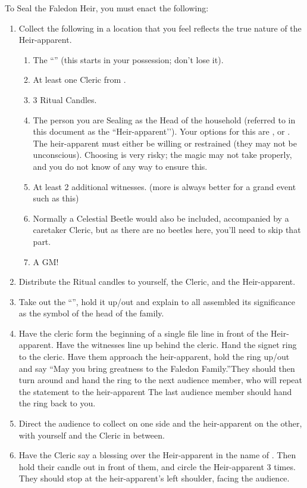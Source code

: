 \documentclass[green]{GL2020}
\begin{document}
To Seal the Faledon Heir, you must enact the following:
\begin{enumerate}
  \item Collect the following in a location that you feel reflects the true nature of the Heir-apparent.
    \begin{enumerate}
      \item The ``\iFaledonRing{}'' (this starts in your possession; don’t lose it).
      \item At least one Cleric from \pTech{}.
      \item 3 Ritual Candles.
      \item The person you are Sealing as the Head of the \cFaledonParent{\formal} household (referred to in this document as the ``Heir-apparent’’). Your options for this are \cHeir{}, or \cAmbition{}. The heir-apparent must either be willing or restrained (they may not be unconscious). Choosing \cAmbition{} is very risky; the magic may not take properly, and you do not know of any way to ensure this.
      \item At least 2 additional witnesses. (more is always better for a grand event such as this)
      \item Normally a Celestial Beetle would also be included, accompanied by a caretaker Cleric, but as there are no beetles here, you’ll need to skip that part.
      \item A GM!
    \end{enumerate}
  \item Distribute the Ritual candles to yourself, the Cleric, and the Heir-apparent.
  \item Take out the ``\iFaledonRing{}'', hold it up/out and explain to all assembled its significance as the symbol of the head of the \cFaledonParent{\formal} family.
  \item Have the cleric form the beginning of a single file line in front of the Heir-apparent. Have the witnesses line up behind the cleric. Hand the signet ring to the cleric. Have them approach the heir-apparent, hold the ring up/out and say ``May you bring greatness to the Faledon Family.''They should then turn around and hand the ring to the next audience member, who will repeat the statement to the heir-apparent The last audience member should hand the ring back to you.
  \item Direct the audience to collect on one side and the heir-apparent on the other, with yourself and the Cleric in between.
  \item Have the Cleric say a blessing over the Heir-apparent in the name of \cTechGod{}. Then hold their candle out in front of them, and circle the Heir-apparent 3 times. They should stop at the heir-apparent’s left shoulder, facing the audience.

\end{enumerate}
\end{document}
